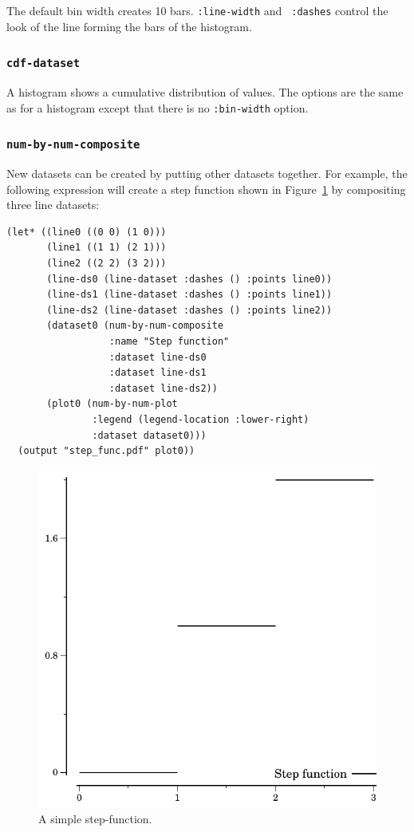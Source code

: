 \documentclass{article}
\begin{document}
The default bin width creates 10 bars.  {\tt :line-width} and {\tt
  :dashes} control the look of the line forming the bars of the
histogram.

\subsubsection{\tt cdf-dataset}

A histogram shows a cumulative distribution of values.
The options are the same as for a histogram except that there is no
{\tt :bin-width} option.

\subsubsection{\tt num-by-num-composite}

New datasets can be created by putting other datasets together.  For
example, the following expression will create a step function shown in
Figure~\ref{fig:step} by compositing three line datasets:

\begin{verbatim}
(let* ((line0 ((0 0) (1 0)))
       (line1 ((1 1) (2 1)))
       (line2 ((2 2) (3 2)))
       (line-ds0 (line-dataset :dashes () :points line0))
       (line-ds1 (line-dataset :dashes () :points line1))
       (line-ds2 (line-dataset :dashes () :points line2))
       (dataset0 (num-by-num-composite
                  :name "Step function"
                  :dataset line-ds0
                  :dataset line-ds1
                  :dataset line-ds2))
       (plot0 (num-by-num-plot
               :legend (legend-location :lower-right)
               :dataset dataset0)))
  (output "step_func.pdf" plot0))
\end{verbatim}

\begin{figure}[t]
\begin{center}
\includegraphics{step_func}
\caption{\label{fig:step}A simple step-function.}
\end{center}
\end{figure}
\end{document}
